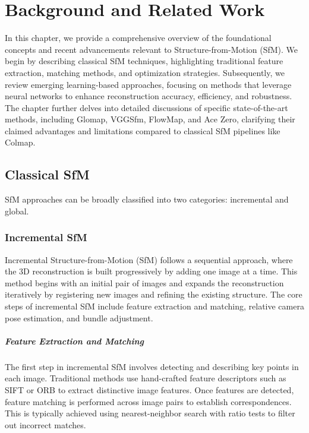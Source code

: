 \chapter{Background and Related Work}\label{chap:related_work}

In this chapter, we provide a comprehensive overview of the foundational concepts and recent advancements relevant to Structure-from-Motion (SfM).
We begin by describing classical SfM techniques, highlighting traditional feature extraction, matching methods, and optimization strategies. 
Subsequently, we review emerging learning-based approaches, focusing on methods that leverage neural networks to enhance reconstruction accuracy, efficiency, and robustness. 
The chapter further delves into detailed discussions of specific state-of-the-art methods, including Glomap, VGGSfm, FlowMap, and Ace Zero, 
clarifying their claimed advantages and limitations compared to classical SfM pipelines like Colmap.

\section{Classical SfM}
SfM approaches can be broadly classified into two categories: incremental and global.

\subsection{Incremental SfM}
Incremental Structure-from-Motion (SfM) follows a sequential approach, where the 3D reconstruction is built progressively by adding one image at a time. 
This method begins with an initial pair of images and expands the reconstruction iteratively by registering new images and refining the existing structure. 
The core steps of incremental SfM include feature extraction and matching, relative camera pose estimation, and bundle adjustment.

\paragraph{Feature Extraction and Matching}
The first step in incremental SfM involves detecting and describing key points in each image. 
Traditional methods use hand-crafted feature descriptors such as SIFT or ORB to extract distinctive image features. 
Once features are detected, feature matching is performed across image pairs to establish correspondences. 
This is typically achieved using nearest-neighbor search with ratio tests to filter out incorrect matches.

